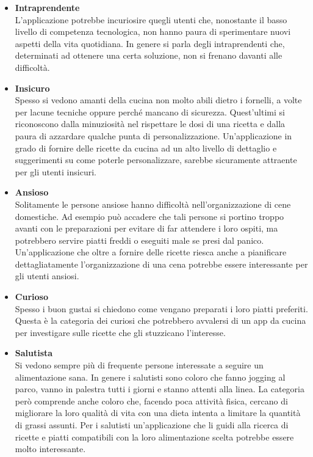 \begin{itemize}
\item \textbf{Intraprendente}\\
L'applicazione potrebbe incuriosire quegli utenti che, nonostante il
basso livello di competenza tecnologica, non hanno paura di sperimentare
nuovi aspetti della vita quotidiana. In genere si parla degli
intraprendenti che, determinati ad ottenere una certa soluzione, non si
frenano davanti alle difficoltà.
\item \textbf{Insicuro}\\
Spesso si vedono amanti della cucina non molto abili dietro i fornelli,
a volte per lacune tecniche oppure perché mancano di sicurezza.
Quest'ultimi si riconoscono dalla minuziosità nel rispettare le dosi di
una ricetta e dalla paura di azzardare qualche punta di
personalizzazione.
Un'applicazione in grado di fornire delle ricette da cucina ad un alto
livello di dettaglio e suggerimenti su come poterle personalizzare,
sarebbe sicuramente attraente per gli utenti insicuri.
\item \textbf{Ansioso}\\
Solitamente le persone ansiose hanno difficoltà nell'organizzazione di
cene domestiche. Ad esempio può accadere che tali persone si portino troppo avanti
con le preparazioni per evitare di far attendere i loro ospiti, ma
potrebbero servire piatti freddi o eseguiti male se presi dal panico.
Un'applicazione che oltre a fornire delle ricette riesca anche a
pianificare dettagliatamente l'organizzazione di una cena potrebbe essere
interessante per gli utenti ansiosi.
\item \textbf{Curioso}\\
Spesso i buon gustai si chiedono come vengano preparati i loro piatti
preferiti. Questa è la categoria dei curiosi che potrebbero avvalersi di
un app da cucina per investigare sulle ricette che gli stuzzicano
l'interesse.
\item \textbf{Salutista}\\
Si vedono sempre più di frequente persone interessate a seguire un
alimentazione sana. In genere i salutisti sono coloro che fanno jogging
al parco, vanno in palestra tutti i giorni e stanno attenti alla linea.
La categoria però comprende anche coloro che, facendo poca attività
fisica, cercano di migliorare la loro qualità di vita con una dieta intenta 
a limitare la quantità di grassi assunti.
Per i salutisti un'applicazione che li guidi alla ricerca di ricette e
piatti compatibili con la loro alimentazione scelta potrebbe essere
molto interessante.

\end{itemize}


